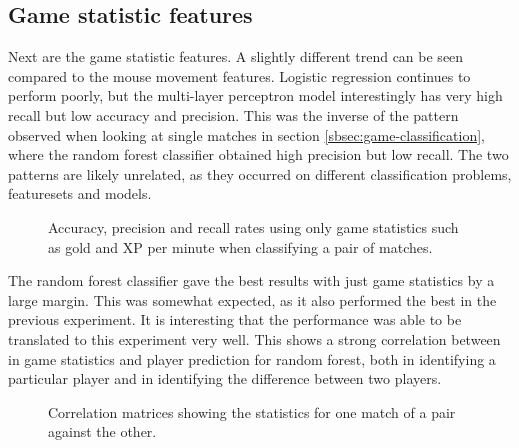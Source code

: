 \documentclass[Report.tex]{subfiles}
\newcommand{\baraxis}[8]{
\begin{axis}[
    ybar,
    title={#1},
    width=#5,
    height=#6,
    ymin=#3, ymax=#4,
    bar width=1em,
    legend style={at={#7},anchor=north,legend columns=-1},
    enlarge x limits=0.4,
    x tick label style={align=center,text width=#8},
    symbolic x coords={Logistic Regression, Random Forest, Multi-layer Perceptron},
    xtick=data,
    ylabel={#2}
]
}
\newcommand{\plotbar}[5]{
\addplot+[
	discard if not={numSplits}{#1},
	discard if not={split}{#2},
	discard if not={features}{#3},
] table [x=model, y=#4,col sep=comma] {data/19-pair-cv.csv};
\addlegendentry{#5}
}
\begin{document}

\subsection{Game statistic features}
Next are the game statistic features. A slightly different trend can be seen compared to the mouse movement features. Logistic regression continues to perform poorly, but the multi-layer perceptron model interestingly has very high recall but low accuracy and precision. This was the inverse of the pattern observed when looking at single matches in section \ref{sbsec:game-classification}, where the random forest classifier obtained high precision but low recall. The two patterns are likely unrelated, as they occurred on different classification problems, featuresets and models.


\begin{figure}[H]
\centering
{}
\caption{Accuracy, precision and recall rates using only game statistics such as gold and XP per minute when classifying a pair of matches.}
\end{figure}

The random forest classifier gave the best results with just game statistics by a large margin. This was somewhat expected, as it also performed the best in the previous experiment. It is interesting that the performance was able to be translated to this experiment very well. This shows a strong correlation between in game statistics and player prediction for random forest, both in identifying a particular player and in identifying the difference between two players. 

\begin{figure}[H]
\vspace{-2cm}
\begin{subfigure}{1\textwidth}
\end{subfigure}

\begin{subfigure}{1\textwidth}
\end{subfigure}
\caption{Correlation matrices showing the statistics for one match of a pair against the other.}
\label{fig:stats-correlation}
\end{figure}
\end{document}
